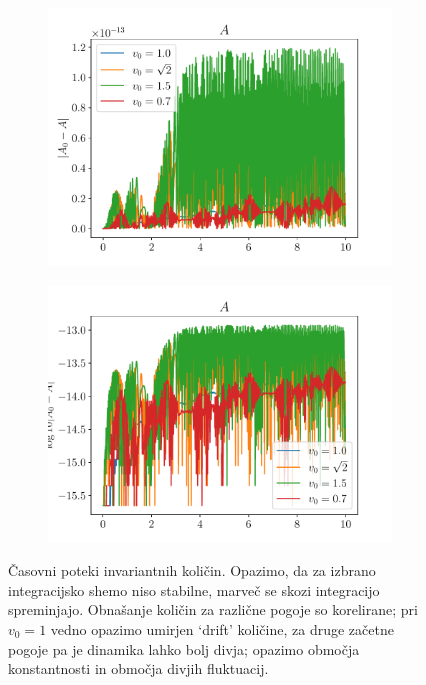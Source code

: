 \begin{figure}
    \begin{subfigure}{0.48\textwidth}
        \includegraphics[width=\textwidth]{../images/1-1-A_lin.pdf}
    \end{subfigure}
    \hfill
    \begin{subfigure}{0.48\textwidth}
        \includegraphics[width=\textwidth]{../images/1-1-A_log.pdf}
    \end{subfigure}

    \caption{ Časovni poteki invariantnih količin. Opazimo, da za izbrano
        integracijsko shemo niso stabilne, marveč se skozi integracijo
        spreminjajo.    Obnašanje količin za različne pogoje so korelirane; pri
        $v_0=1$ vedno opazimo umirjen `drift' količine, za druge začetne pogoje
        pa je dinamika lahko bolj divja; opazimo območja konstantnosti in
        območja divjih fluktuacij.}
    \label{fig:1-1_invariantne_kolicine}
\end{figure}

